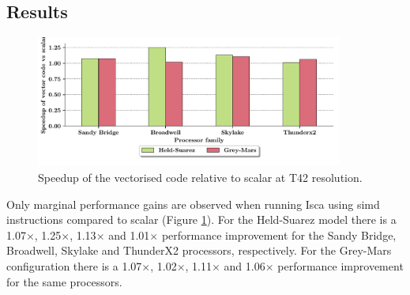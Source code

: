 \documentclass[a4paper,11pt]{report}
\begin{document}
\subsection{Results}
\begin{figure}[htbp]
\begin{center}
\includegraphics[width=0.9\textwidth]{img/speedup-vector.pdf}
\caption{Speedup of the vectorised code relative to scalar at T42 resolution. }
\label{fig:vector-gains}
\end{center}
\end{figure}
\par
Only marginal performance gains are observed when running Isca using \gls{simd} instructions compared to scalar (Figure \ref{fig:vector-gains}). For the Held-Suarez model there is a 1.07$\times$, 1.25$\times$, 1.13$\times$ and 1.01$\times$ performance improvement for the Sandy Bridge, Broadwell, Skylake and ThunderX2 processors, respectively. For the Grey-Mars configuration there is a 1.07$\times$, 1.02$\times$, 1.11$\times$ and 1.06$\times$ performance improvement for the same processors.
\end{document}
